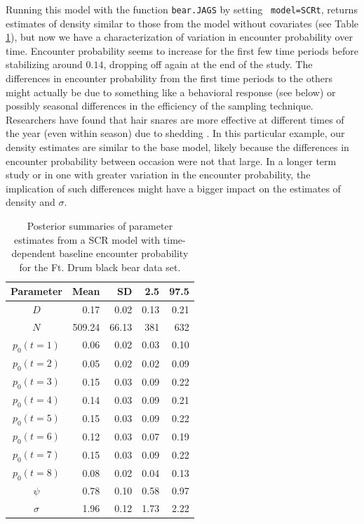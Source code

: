 Running this model with the function {\tt bear.JAGS} by setting {\tt
  model=SCRt}, returns estimates of density similar to those from the model 
  without covariates (see Table \ref{covariates.tab.SCRt}), but
now we have a characterization of variation in encounter probability
over time.  Encounter probability seems to increase for the first few
time periods before stabilizing around $0.14$, dropping off again at
the end of the study.  The differences in encounter probability from
the first time periods to the others might actually be due to
something like a behavioral response (see below) or possibly seasonal
differences in the efficiency of the sampling technique.  Researchers
have found that hair snares are more effective at different times of
the year (even within season) due to shedding
\citep{wegan_etal:2012}.  In this particular example, our density
estimates are similar to the base model, likely because the
differences in encounter probability
 between occasion were not that large.  In a
longer term study or in one with greater variation in the encounter
probability, the implication of such differences might have a bigger
impact on the estimates of density and $\sigma$.

\begin{table}[ht]
\centering
\caption{Posterior summaries of parameter estimates from a SCR model with time-dependent baseline 
encounter probability
 for the Ft. Drum black bear data set.}
\begin{tabular}{crrrr}
\hline \hline
Parameter & Mean & SD & 2.5 & 97.5 \\
\hline
$D$           &    0.17     &  0.02    & 0.13 & 0.21 \\
$N$           &   509.24 &  66.13  & 381  & 632  \\
$p_0 (t=1)$  &    0.06     & 0.02     & 0.03  & 0.10  \\
$p_0 (t=2)$  &    0.05  & 0.02  &      0.02 & 0.09  \\
$p_0 (t=3)$  &    0.15 &  0.03  &     0.09 & 0.22  \\
$p_0 (t=4)$  &    0.14 &  0.03  &     0.09 & 0.21  \\
$p_0 (t=5)$  &    0.15 &  0.03  &    0.09 &  0.22  \\
$p_0 (t=6)$  &    0.12 &  0.03  &    0.07 & 0.19  \\
$p_0 (t=7)$  &    0.15 &  0.03  &    0.09 & 0.22  \\
$p_0 (t=8)$  &    0.08 &  0.02  &    0.04 & 0.13  \\
$\psi$  &   0.78 &  0.10  &  0.58 & 0.97  \\
$\sigma$ & 1.96 &  0.12  &   1.73 & 2.22  \\ \hline
\end{tabular}
\label{covariates.tab.SCRt}
\end{table}

